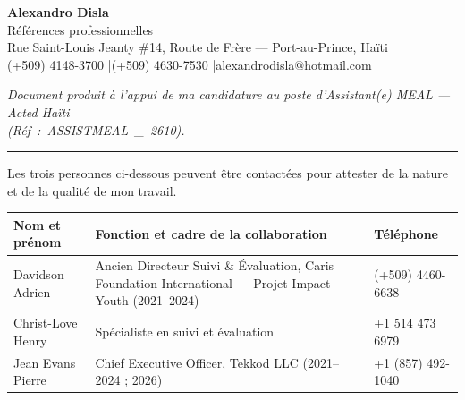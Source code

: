 \documentclass[11pt,a4paper]{article}
\begin{document}
\begin{center}
    {\LARGE\bfseries\color{cvblue} Alexandro Disla}\\[2pt]
    {\large Références professionnelles}\\[6pt]
    {\small Rue Saint-Louis Jeanty \#14, Route de Frère --- Port-au-Prince, Haïti\\
    (+509) 4148-3700 \quad|\quad (+509) 4630-7530 \quad|\quad alexandrodisla@hotmail.com}
\end{center}

\vspace{4pt}
{\small\itshape Document produit à l'appui de ma candidature au poste d'Assistant(e) MEAL ---
Acted Haïti\\(\mbox{Réf : ASSISTMEAL \_ 2610}).}

\vspace{10pt}
\hrule
\vspace{14pt}

Les trois personnes ci-dessous peuvent être contactées pour attester de la nature et de la qualité
de mon travail.

\vspace{10pt}
\renewcommand{\arraystretch}{1.4}
\begin{tabular}{L{3.4cm} L{8cm} L{3.8cm}}
\toprule
\textbf{Nom et prénom} & \textbf{Fonction et cadre de la collaboration} & \textbf{Téléphone} \\
\midrule
Davidson Adrien & Ancien Directeur Suivi \& Évaluation, Caris Foundation International --- Projet Impact Youth (2021--2024) & (+509) 4460-6638 \\
\addlinespace
Christ-Love Henry & Spécialiste en suivi et évaluation & +1 514 473 6979 \\
\addlinespace
Jean Evans Pierre & Chief Executive Officer, Tekkod LLC (2021--2024 ; 2026) & +1 (857) 492-1040 \\
\bottomrule
\end{tabular}
\end{document}

